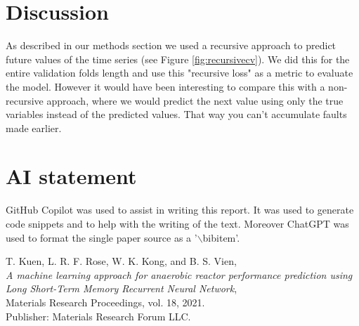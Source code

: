 \documentclass[conference]{IEEEtran}
\begin{document}
\section{Discussion}
As described in our methods section we used a recursive approach to predict future values of the time series (see Figure \ref{fig:recursivecv}).
We did this for the entire validation folds length and use this "recursive loss" as a metric to evaluate the model. 
However it would have been interesting to compare this with a non-recursive approach, where we would predict the next 
value using only the true variables instead of the predicted values. That way you can't accumulate faults
made earlier.


\section*{AI statement}
GitHub Copilot was used to assist in writing this report. It was used to generate code snippets and
to help with the writing of the text. Moreover ChatGPT was used to format the single paper source as a 
'$\backslash$bibitem'.


\begin{thebibliography}{9}

    T. Kuen, L. R. F. Rose, W. K. Kong, and B. S. Vien,\\
    \textit{A machine learning approach for anaerobic reactor performance prediction using Long Short-Term Memory Recurrent Neural Network},\\
    Materials Research Proceedings, vol. 18, 2021.\\
    Publisher: Materials Research Forum LLC.
    
    \end{thebibliography}
    
\end{document}
